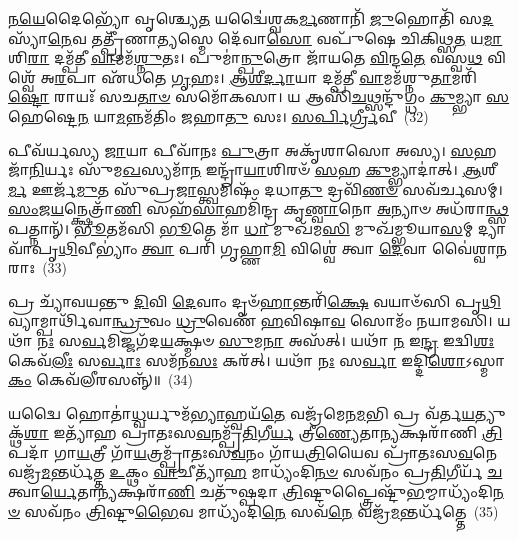 \-\ul{𑌨}\-\-\ul{𑌯𑍇}\-𑌦𑍈𑌭𑍍𑌯𑍋᳴ 𑌵𑍃𑌶𑍍𑌚𑍍𑌯𑍇\-\ul{𑌤} 𑌯𑌦𑍍𑌵𑍈॑𑌶𑍍𑌵𑌕\-\ul{𑌰𑍍𑌮}\-𑌣𑌾𑌨𑌿᳴ \ul{𑌜𑍁}\-𑌹𑍋𑌤𑌿᳴ 𑌸\-\ul{𑌦}\-𑌸𑍍𑌯𑌾᳴\-\ul{𑌨𑍇}\-𑌵 𑌤𑌤𑍍𑌪𑍍𑌰𑍀᳴𑌣𑌾\-\ul{𑌤𑍍𑌯}\-𑌸𑍍𑌮𑍇 𑌦𑍇᳴𑌵𑌾\-\ul{𑌸𑍋} 𑌵𑌪𑍁᳴𑌷𑍇 𑌚𑌿𑌕𑌿𑌥𑍍𑌸\-\ul{𑌤} 𑌯\-\ul{𑌮𑌾}\-𑌶𑌿\-\ul{𑌰𑌾} 𑌦𑌮𑍍𑌪᳴𑌤𑍀 \ul{𑌵𑌾}\-𑌮𑌮᳴\-\ul{𑌶𑍍𑌨𑍁}\-𑌤𑌃। 𑌪𑍁𑌮𑌾॑\-\ul{𑌨𑍍𑌪𑍁}\-𑌤𑍍𑌰𑍋 𑌜𑌾᳴𑌯𑌤𑍇 \ul{𑌵𑌿}\-𑌨𑍍𑌦\-\ul{𑌤𑍇} 𑌵𑌸𑍍𑌵\-\ul{𑌥} 𑌵𑌿𑌶𑍍𑌵𑍇᳴ 𑌅\-\ul{𑌰}\-𑌪𑌾 𑌏᳴𑌧𑌤𑍇 \ul{𑌗𑍃}\-𑌹𑌃। \ul{𑌆}\-\-\ul{𑌶𑍀}\-\-\ul{𑌰𑍍𑌦𑌾}\-𑌯𑌾 𑌦𑌮𑍍𑌪᳴𑌤𑍀 \ul{𑌵𑌾}\-𑌮𑌮᳴𑌶𑍍𑌨𑍁\-\ul{𑌤𑌾}\-𑌮𑌰𑌿᳴\-\ul{𑌷𑍍𑌟𑍋} 𑌰𑌾𑌯𑌃᳴ 𑌸𑌚\-\ul{𑌤𑌾}\-\-\ul{𑍞} 𑌸𑌮𑍋᳴𑌕𑌸𑌾। 𑌯 𑌆𑌸𑌿᳴\-\ul{𑌚}\-𑌥𑍍𑌸𑌨𑍍𑌦𑍁᳴𑌗𑍍𑌧𑌂 \ul{𑌕𑍁}\-𑌮𑍍𑌭𑍍𑌯𑌾 \ul{𑌸}\-𑌹𑍇𑌷𑍍𑌟𑍇\-\ul{𑌨} 𑌯𑌾\-\ul{𑌮}\-𑌨𑍍𑌨𑌮᳴𑌤𑌿𑌂 𑌜𑌹𑌾\-\ul{𑌤𑍁} 𑌸𑌃। \ul{𑌸}\-\-\ul{𑌰𑍍𑌪𑌿}\-\-\ul{𑌰𑍍𑌗𑍍𑌰𑍀}\-𑌵𑍀~(32)


𑌪𑍀𑌵᳴𑌰𑍍𑌯𑌸𑍍𑌯 \ul{𑌜𑌾}\-𑌯𑌾 𑌪𑍀𑌵𑌾᳴𑌨𑌃 \ul{𑌪𑍁}\-𑌤𑍍𑌰𑌾 𑌅𑌕𑍃᳴𑌶𑌾𑌸𑍋 𑌅𑌸𑍍𑌯। \ul{𑌸}\-𑌹𑌜𑌾᳴\-\ul{𑌨𑌿}\-𑌰𑍍𑌯𑌃 𑌸𑍁᳴𑌮\-\ul{𑌖}\-𑌸𑍍𑌯𑌮𑌾᳴\-\ul{𑌨} 𑌇𑌨𑍍𑌦𑍍𑌰𑌾᳴\-\ul{𑌯𑌾}\-𑌶𑌿𑌰𑍞᳴ \ul{𑌸}\-𑌹 \ul{𑌕𑍁}\-𑌮𑍍𑌭𑍍𑌯𑌾𑌦𑌾॑𑌤𑍍। \ul{𑌆}\-𑌶𑍀\-\ul{𑌰𑍍𑌮} 𑌊𑌰𑍍𑌜᳴\-\ul{𑌮𑍁}\-𑌤 𑌸𑍁᳴𑌪𑍍𑌰\-\ul{𑌜𑌾}\-𑌸𑍍𑌤𑍍𑌵𑌮𑌿𑌷𑌂᳴ 𑌦𑌧𑌾\-\ul{𑌤𑍁} 𑌦𑍍𑌰𑌵𑌿᳴\-\ul{𑌣}\-\-\ul{𑍞} 𑌸𑌵᳴𑌰𑍍𑌚𑌸𑌮𑍍। \ul{𑌸𑌂}\-𑌜\-\ul{𑌯}\-𑌨𑍍𑌕𑍍𑌷𑍇𑌤𑍍𑌰𑌾᳴\-\ul{𑌣𑌿} 𑌸𑌹᳴\-\ul{𑌸𑌾}\-𑌹𑌮𑌿᳴𑌨𑍍𑌦𑍍𑌰 𑌕𑍃\-\ul{𑌣𑍍𑌵𑌾}\-𑌨𑍋 \ul{𑌅}\-𑌨𑍍𑌯𑌾𑍞 𑌅𑌧᳴𑌰𑌾\-\ul{𑌨𑍍𑌥𑍍𑌸}\-𑌪𑌤𑍍𑌨𑌾𑌨𑍍᳴। \ul{𑌭𑍂}\-𑌤𑌮᳴𑌸𑌿 \ul{𑌭𑍂}\-𑌤𑍇 𑌮𑌾᳴ \ul{𑌧𑌾} 𑌮𑍁𑌖᳴𑌮\-\ul{𑌸𑌿} 𑌮𑍁𑌖᳴𑌮𑍍𑌭𑍂𑌯𑌾\-\ul{𑌸}\-𑌮𑍍 𑌦𑍍𑌯𑌾𑌵𑌾᳴𑌪𑍃\-\ul{𑌥𑌿}\-𑌵𑍀\-𑌭𑍍𑌯𑌾𑌂॑ \ul{𑌤𑍍𑌵𑌾} 𑌪𑌰𑌿᳴ 𑌗𑍃𑌹𑍍𑌣𑌾\-\ul{𑌮𑌿} 𑌵𑌿𑌶𑍍𑌵𑍇॑ 𑌤𑍍𑌵𑌾 \ul{𑌦𑍇}\-𑌵𑌾 𑌵𑍈॑𑌶𑍍𑌵𑌾\-\ul{𑌨}\-𑌰𑌾𑌃~(33)

𑌪𑍍𑌰 𑌚𑍍𑌯𑌾᳴𑌵𑌯𑌨𑍍𑌤𑍁 \ul{𑌦𑌿}\-𑌵𑌿 \ul{𑌦𑍇}\-𑌵𑌾𑌂 𑌦𑍃𑍞᳴\-\ul{𑌹𑌾}\-𑌨𑍍𑌤𑌰𑌿᳴\-\ul{𑌕𑍍𑌷𑍇} 𑌵𑌯𑌾𑍞᳴𑌸𑌿 𑌪𑍃\-\ul{𑌥𑌿}\-𑌵𑍍𑌯𑌾𑌮𑍍𑌪𑌾𑌰𑍍𑌥𑌿᳴𑌵𑌾\-\ul{𑌨𑍍𑌧𑍍𑌰𑍁}\-𑌵𑌂 \ul{𑌧𑍍𑌰𑍁}\-𑌵𑍇𑌣᳴ \ul{𑌹}\-𑌵𑌿𑌷𑌾\-\ul{𑌵} 𑌸𑍋𑌮𑌂᳴ 𑌨𑌯𑌾𑌮𑌸𑌿। 𑌯𑌥𑌾᳴ \ul{𑌨𑌃} 𑌸\-\ul{𑌰𑍍𑌵}\-𑌮𑌿𑌜𑍍𑌜𑌗᳴𑌦\-\ul{𑌯}\-𑌕𑍍𑌷𑍍𑌮𑍞 \ul{𑌸𑍁}\-𑌮\-\ul{𑌨𑌾} 𑌅𑌸᳴𑌤𑍍। 𑌯𑌥𑌾᳴ \ul{𑌨} 𑌇\-\ul{𑌨𑍍𑌦𑍍𑌰} 𑌇𑌦𑍍𑌵𑌿\-\ul{𑌶𑌃} 𑌕𑍇𑌵᳴\-\ul{𑌲𑍀𑌃} 𑌸\-\ul{𑌰𑍍𑌵𑌾𑌃} 𑌸𑌮᳴𑌨\-\ul{𑌸𑌃} 𑌕𑌰᳴𑌤𑍍। 𑌯𑌥𑌾᳴ \ul{𑌨𑌃} 𑌸\-\ul{𑌰𑍍𑌵𑌾} 𑌇𑌦𑍍𑌦𑌿\-\ul{𑌶𑍋}\-\-𑌽𑌸𑍍𑌮𑌾\-\ul{𑌕𑌂} 𑌕𑍇𑌵᳴𑌲𑍀𑌰𑌸𑌨𑍍𑌨𑍍᳴॥~(34)

{\anuvakamend[{𑌏𑌨᳴𑌸𑌾 𑌵𑌿𑌶𑍍𑌵𑌕\-\ul{𑌰𑍍𑌮}\-𑌨𑍍 𑌯𑍋 𑌦𑌕𑍍𑌷𑌿᳴\-\ul{𑌣𑌾𑌂} 𑌨 𑌸᳴𑌰𑍍𑌪𑌿\-\ul{𑌰𑍍𑌗𑍍𑌰𑍀}\-𑌵𑍀 𑌵𑍈॑𑌶𑍍𑌵𑌾\-\ul{𑌨}\-𑌰𑌾𑌶𑍍𑌚᳴𑌤𑍍𑌵𑌾\-\ul{𑌰𑌿}\-\-\ul{𑍞}\-𑌶𑌚𑍍𑌚᳴}]}%

𑌯𑌦𑍍𑌵𑍈 𑌹𑍋𑌤𑌾॑\-\ul{𑌧𑍍𑌵}\-𑌰𑍍𑌯𑍁𑌮᳴\-\ul{𑌭𑍍𑌯𑌾}\-𑌹𑍍𑌵𑌯᳴\-\ul{𑌤𑍇} 𑌵𑌜𑍍𑌰᳴𑌮𑍇𑌨\-\ul{𑌮}\-𑌭𑌿 𑌪𑍍𑌰 𑌵᳴𑌰𑍍𑌤\-\ul{𑌯}\-𑌤𑍍𑌯𑍁𑌕𑍍𑌥᳴\-\ul{𑌶𑌾} 𑌇𑌤𑍍𑌯𑌾᳴𑌹 𑌪𑍍𑌰𑌾𑌤𑌃𑌸\-\ul{𑌵}\-𑌨𑌮𑍍𑌪𑍍𑌰᳴\-\ul{𑌤𑌿}\-𑌗𑍀\-\ul{𑌰𑍍𑌯} 𑌤𑍍𑌰𑍀\-\ul{𑌣𑍍𑌯𑍇}\-𑌤𑌾\-\ul{𑌨𑍍𑌯}\-𑌕𑍍𑌷𑌰𑌾᳴𑌣𑌿 \ul{𑌤𑍍𑌰𑌿}\-𑌪𑌦𑌾᳴ 𑌗𑌾\-\ul{𑌯}\-𑌤𑍍𑌰𑍀 𑌗𑌾᳴\-\ul{𑌯}\-𑌤𑍍𑌰𑌮𑍍𑌪𑍍𑌰𑌾᳴𑌤𑌃𑌸\-\ul{𑌵}\-𑌨𑌂 𑌗𑌾᳴𑌯\-\ul{𑌤𑍍𑌰𑌿}\-𑌯𑍈𑌵 𑌪𑍍𑌰𑌾᳴𑌤𑌃𑌸\-\ul{𑌵}\-𑌨𑍇 𑌵𑌜𑍍𑌰᳴\-\ul{𑌮}\-𑌨𑍍𑌤𑌰𑍍𑌧᳴𑌤𑍍𑌤 \ul{𑌉}\-𑌕𑍍𑌥𑌂 \ul{𑌵𑌾}\-𑌚𑍀𑌤𑍍𑌯𑌾᳴\-\ul{𑌹} 𑌮𑌾𑌧𑍍𑌯𑌂᳴𑌦𑌿\-\ul{𑌨}\-\-\ul{𑍞} 𑌸𑌵᳴𑌨𑌂 𑌪𑍍𑌰\-\ul{𑌤𑌿}\-𑌗𑍀𑌰𑍍𑌯᳴ \ul{𑌚}\-𑌤𑍍𑌵𑌾\-\ul{𑌰𑍍𑌯𑍇}\-𑌤𑌾\-\ul{𑌨𑍍𑌯}\-𑌕𑍍𑌷𑌰𑌾᳴\-\ul{𑌣𑌿} 𑌚𑌤𑍁᳴𑌷𑍍𑌪𑌦𑌾 \ul{𑌤𑍍𑌰𑌿}\-𑌷𑍍𑌟𑍁𑌪𑍍𑌤𑍍𑌰𑍈𑌷𑍍𑌟𑍁᳴\-\ul{𑌭}\-𑌮𑍍𑌮𑌾𑌧𑍍𑌯𑌂᳴𑌦𑌿\-\ul{𑌨}\-\-\ul{𑍞} 𑌸𑌵᳴𑌨𑌂 \ul{𑌤𑍍𑌰𑌿}\-𑌷𑍍𑌟𑍁\-\ul{𑌭𑍈}\-𑌵 𑌮𑌾𑌧𑍍𑌯𑌂᳴𑌦𑌿\-\ul{𑌨𑍇} 𑌸𑌵᳴\-\ul{𑌨𑍇} 𑌵𑌜𑍍𑌰᳴\-\ul{𑌮}\-𑌨𑍍𑌤𑌰𑍍𑌧᳴𑌤𑍍𑌤𑍇~(35)

